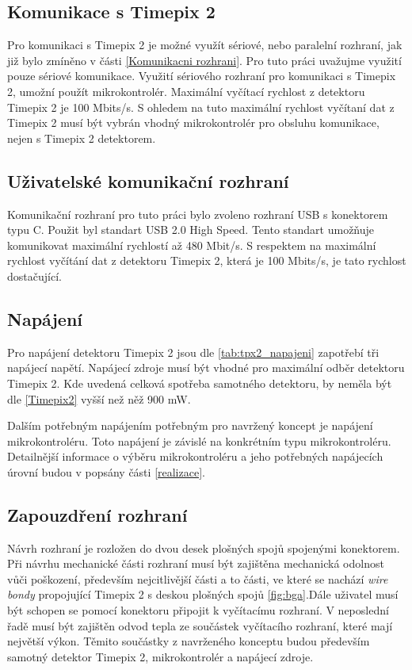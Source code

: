 \subsection{Komunikace s Timepix 2}
Pro komunikaci s Timepix 2 je možné využít sériové, nebo paralelní rozhraní, jak již bylo zmíněno v části \ref{Komunikacni rozhrani}. Pro tuto práci uvažujme využití pouze sériové komunikace. Využití sériového rozhraní pro komunikaci s Timepix 2, umožní použít mikrokontrolér. Maximální vyčítací rychlost z detektoru Timepix 2 je 100 Mbits/s. S ohledem na tuto maximální rychlost vyčítaní dat z Timepix 2 musí být vybrán vhodný mikrokontrolér pro obsluhu komunikace, nejen s Timepix 2 detektorem. 

\subsection{Uživatelské komunikační rozhraní}
Komunikační rozhraní pro tuto práci bylo zvoleno rozhraní USB s konektorem typu C. Použit byl standart USB 2.0 High Speed. Tento standart umožňuje komunikovat maximální rychlostí až 480 Mbit/s. S respektem na maximální rychlost vyčítání dat z detektoru Timepix 2, která je 100 Mbits/s, je tato rychlost dostačující. 

\subsection{Napájení}
Pro napájení detektoru Timepix 2 jsou dle \ref{tab:tpx2_napajeni} zapotřebí tři napájecí napětí. Napájecí zdroje musí být vhodné pro maximální odběr detektoru Timepix 2. Kde uvedená celková spotřeba samotného detektoru, by neměla být dle \ref{Timepix2} vyšší než něž 900 mW. 
\par Dalším potřebným napájením potřebným pro navržený koncept je napájení mikrokontroléru. Toto napájení je závislé na konkrétním typu mikrokontroléru. Detailnější informace o výběru mikrokontroléru a jeho potřebných napájecích úrovní budou v popsány části \ref{realizace}. 

\subsection{Zapouzdření rozhraní}
Návrh rozhraní je rozložen do dvou desek plošných spojů spojenými konektorem. Při návrhu mechanické části rozhraní musí být zajištěna mechanická odolnost vůči poškození, především nejcitlivější části a to části, ve které se nachází \textit{wire bondy} propojující Timepix 2 s deskou plošných spojů \ref{fig:bga}.Dále uživatel musí být schopen se pomocí konektoru připojit k vyčítacímu rozhraní. V neposlední řadě musí být zajištěn odvod tepla ze součástek vyčítacího rozhraní, které mají největší výkon. Těmito součástky z navrženého konceptu budou především samotný detektor Timepix 2, mikrokontrolér a napájecí zdroje. 
